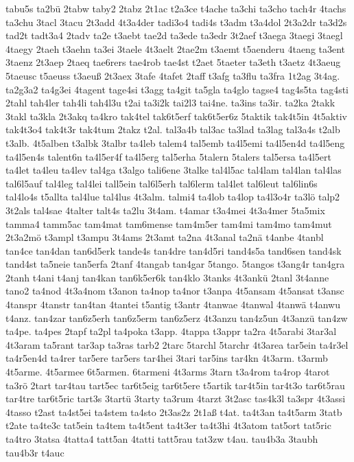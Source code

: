 {tabu5s
ta2bü
2tabw
taby2
2tabz
2t1ac
t2a3ce
t4ache
ta3chi
ta3cho
tach4r
4tachs
ta3chu
3tacl
3tacu
2t3add
4t3a4der
tadi3o4
tadi4s
t3adm
t3a4dol
2t3a2dr
ta3d2s
tad2t
tadt3a4
2tadv
ta2e
t3aebt
tae2d
ta3ede
ta3edr
3t2aef
t3aega
3taegi
3taegl
4taegy
2taeh
t3aehn
ta3ei
3taele
4t3aelt
2tae2m
t3aemt
t5aenderu
4taeng
ta3ent
3taenz
2t3aep
2taeq
tae6rers
tae4rob
tae4st
t2aet
5taeter
ta3eth
t3aetz
4t3aeug
5taeusc
t5aeuss
t3aeuß
2t3aex
3tafe
4tafet
2taff
t3afg
ta3flu
ta3fra
1t2ag
3t4ag.
ta2g3a2
ta4g3ei
4tagent
tage4si
t3agg
ta4git
ta5gla
ta4glo
tagse4
tag4s5ta
tag4sti
2tahl
tah4ler
tah4li
tah4l3u
t2ai
ta3i2k
tai2l3
tai4ne.
ta3ins
ta3ir.
ta2ka
2takk
3takl
ta3kla
2t3akq
ta4kro
tak4tel
tak6t5erf
tak6t5er6z
5taktik
tak4t5in
4t5aktiv
tak4t3o4
tak4t3r
tak4tum
2takz
t2al.
tal3a4b
tal3ac
ta3lad
ta3lag
tal3a4s
t2alb
t3alb.
4t5alben
t3albk
3talbr
ta4leb
talem4
tal5emb
ta4l5emi
ta4l5en4d
ta4l5eng
ta4l5en4s
talent6n
ta4l5er4f
ta4l5erg
tal5erha
5talern
5talers
tal5ersa
ta4l5ert
ta4let
ta4leu
ta4lev
tal4ga
t3algo
tali6ene
3talke
tal4l5ac
tal4lam
tal4lan
tal4las
tal6l5auf
tal4leg
tal4lei
tall5ein
tal6l5erh
tal6lerm
tal4let
tal6leut
tal6lin6s
tal4lo4s
t5allta
tal4lue
tal4lus
4t3alm.
talmi4
ta4lob
ta4lop
ta4l3o4r
ta3lö
talp2
3t2als
tal4sae
4talter
talt4s
ta2lu
3t4am.
t4amar
t3a4mei
4t3a4mer
5ta5mix
tamma4
tamm5ac
tam4mat
tam6mense
tam4m5er
tam4mi
tam4mo
tam4mut
2t3a2mö
t3ampl
t3ampu
3t4ams
2t3amt
ta2na
4t3anal
ta2nä
t4anbe
4tanbl
tan4ce
tan4dan
tan6d5erk
tande4s
tan4dre
tan4d5ri
tand4s5a
tand6sen
tand4sk
tand4st
ta5neie
tan5erfa
2tanf
4tangab
tan4gar
5tango.
5tangos
t3ang4r
tan4gra
2tanh
t4ani
t4anj
tan4kan
tan6k5er6k
tan4klo
3tanks
4t3ankü
2tanl
3t4anne
tano2
ta4nod
4t3a4nom
t3anon
ta4nop
ta4nor
t3anpa
4t5ansam
4t5ansat
t3ansc
4tanspr
4tanstr
tan4tan
4tantei
t5antig
t3antr
4tanwae
4tanwal
4tanwä
t4anwu
t4anz.
tan4zar
tan6z5erh
tan6z5erm
tan6z5erz
4t3anzu
tan4z5un
4t3anzü
tan4zw
ta4pe.
ta4pes
2tapf
ta2pl
ta4poka
t3app.
4tappa
t3appr
ta2ra
4t5arabi
3tar3al
4t3aram
ta5rant
tar3ap
ta3ras
tarb2
2tarc
5tarchl
5tarchr
4t3area
tar5ein
ta4r3el
ta4r5en4d
ta4rer
tar5ere
tar5ers
tar4hei
3tari
tar5ins
tar4kn
4t3arm.
t3armb
4t5arme.
4t5armee
6t5armen.
6tarmeni
4t3arms
3tarn
t3a4rom
ta4rop
4tarot
ta3rö
2tart
tar4tau
tart5ec
tar6t5eig
tar6t5ere
t5artik
tar4t5in
tar4t3o
tar6t5rau
tar4tre
tar6t5ric
tart3s
3tartü
3tarty
ta3rum
4tarzt
3t2asc
tas4k3l
ta3spr
4t3assi
4tasso
t2ast
ta4st5ei
ta4stem
ta4sto
2t3as2z
2t1aß
t4at.
ta4t3an
ta4t5arm
3tatb
t2ate
ta4te3c
tat5ein
ta4tem
ta4t5ent
ta4t3er
ta4t3hi
4t3atom
tat5ort
tat5ric
ta4tro
3tatsa
4tatta4
tatt5an
4tatti
tatt5rau
tat3zw
t4au.
tau4b3a
3taubh
tau4b3r
t4auc
}
